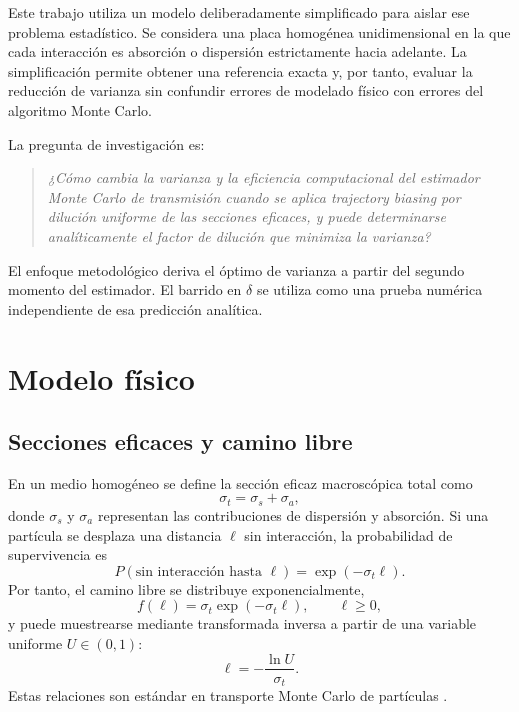 \documentclass[11pt]{article}
\begin{document}
Este trabajo utiliza un modelo deliberadamente simplificado para aislar ese problema estadístico. Se considera una placa homogénea unidimensional en la que cada interacción es absorción o dispersión estrictamente hacia adelante. La simplificación permite obtener una referencia exacta y, por tanto, evaluar la reducción de varianza sin confundir errores de modelado físico con errores del algoritmo Monte Carlo.

La pregunta de investigación es:

\begin{quote}
\emph{¿Cómo cambia la varianza y la eficiencia computacional del estimador Monte Carlo de transmisión cuando se aplica trajectory biasing por dilución uniforme de las secciones eficaces, y puede determinarse analíticamente el factor de dilución que minimiza la varianza?}
\end{quote}

El enfoque metodológico deriva el óptimo de varianza a partir del segundo momento del estimador. El barrido en $\delta$ se utiliza como una prueba numérica independiente de esa predicción analítica.

\section{Modelo físico}
\subsection{Secciones eficaces y camino libre}
En un medio homogéneo se define la sección eficaz macroscópica total como
\begin{equation}
    \sigma_t=\sigma_s+\sigma_a,
\end{equation}
donde $\sigma_s$ y $\sigma_a$ representan las contribuciones de dispersión y absorción. Si una partícula se desplaza una distancia $\ell$ sin interacción, la probabilidad de supervivencia es
\begin{equation}
    P(\text{sin interacción hasta }\ell)=\exp(-\sigma_t\ell).
\end{equation}
Por tanto, el camino libre se distribuye exponencialmente,
\begin{equation}
    f(\ell)=\sigma_t\exp(-\sigma_t\ell),\qquad \ell\ge 0,
\end{equation}
y puede muestrearse mediante transformada inversa a partir de una variable uniforme $U\in(0,1)$:
\begin{equation}
    \ell=-\frac{\ln U}{\sigma_t}.
\end{equation}
Estas relaciones son estándar en transporte Monte Carlo de partículas \cite{vassiliev2017}.
\end{document}
